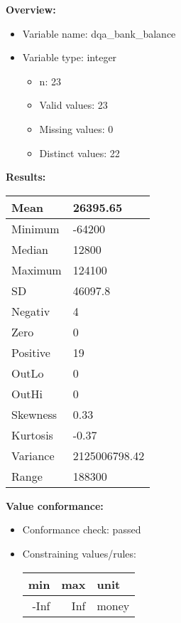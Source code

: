 \documentclass[
]{article}
\providecommand{\tightlist}{%
  \setlength{\itemsep}{0pt}\setlength{\parskip}{0pt}}
\begin{document}
\textbf{Overview:}

\begin{itemize}
\tightlist
\item
  Variable name: dqa\_bank\_balance
\item
  Variable type: integer

  \begin{itemize}
  \tightlist
  \item
    n: 23
  \item
    Valid values: 23
  \item
    Missing values: 0
  \item
    Distinct values: 22
  \end{itemize}
\end{itemize}

\textbf{Results:}\\

\begin{table}[H]
\centering
\begin{tabular}{l|l}
\hline
Mean & 26395.65\\
\hline
Minimum & -64200\\
\hline
Median & 12800\\
\hline
Maximum & 124100\\
\hline
SD & 46097.8\\
\hline
Negativ & 4\\
\hline
Zero & 0\\
\hline
Positive & 19\\
\hline
OutLo & 0\\
\hline
OutHi & 0\\
\hline
Skewness & 0.33\\
\hline
Kurtosis & -0.37\\
\hline
Variance & 2125006798.42\\
\hline
Range & 188300\\
\hline
\end{tabular}
\end{table}

\textbf{Value conformance:}

\begin{itemize}
\tightlist
\item
  Conformance check: passed
\item
  Constraining values/rules:

  \begin{table}[H]
  \centering
  \begin{tabular}{r|r|l}
  \hline
  \textbf{min} & \textbf{max} & \textbf{unit}\\
  \hline
  -Inf & Inf & money\\
  \hline
  \end{tabular}
  \end{table}
\end{itemize}
\end{document}
